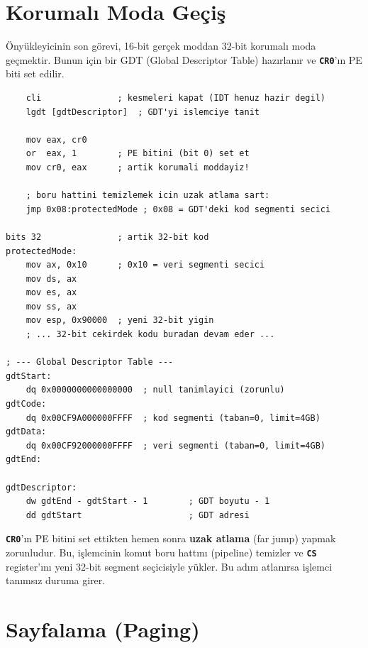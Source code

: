 \documentclass[11pt,a4paper]{article}
\newcommand{\reg}[1]{\texttt{\color{anaMavi}\textbf{#1}}}
\begin{document}
\section{Korumalı Moda Geçiş}

Önyükleyicinin son görevi, 16-bit gerçek moddan 32-bit korumalı moda geçmektir.
Bunun için bir GDT (Global Descriptor Table) hazırlanır ve \reg{CR0}'ın PE
biti set edilir.

\begin{ornekkutu}
\begin{lstlisting}
    cli               ; kesmeleri kapat (IDT henuz hazir degil)
    lgdt [gdtDescriptor]  ; GDT'yi islemciye tanit

    mov eax, cr0
    or  eax, 1        ; PE bitini (bit 0) set et
    mov cr0, eax      ; artik korumali moddayiz!

    ; boru hattini temizlemek icin uzak atlama sart:
    jmp 0x08:protectedMode ; 0x08 = GDT'deki kod segmenti secici

bits 32               ; artik 32-bit kod
protectedMode:
    mov ax, 0x10      ; 0x10 = veri segmenti secici
    mov ds, ax
    mov es, ax
    mov ss, ax
    mov esp, 0x90000  ; yeni 32-bit yigin
    ; ... 32-bit cekirdek kodu buradan devam eder ...

; --- Global Descriptor Table ---
gdtStart:
    dq 0x0000000000000000  ; null tanimlayici (zorunlu)
gdtCode:
    dq 0x00CF9A000000FFFF  ; kod segmenti (taban=0, limit=4GB)
gdtData:
    dq 0x00CF92000000FFFF  ; veri segmenti (taban=0, limit=4GB)
gdtEnd:

gdtDescriptor:
    dw gdtEnd - gdtStart - 1        ; GDT boyutu - 1
    dd gdtStart                     ; GDT adresi
\end{lstlisting}
\end{ornekkutu}

\begin{uyarikutu}
\reg{CR0}'ın PE bitini set ettikten hemen sonra \textbf{uzak atlama} (far jump)
yapmak zorunludur. Bu, işlemcinin komut boru hattını (pipeline) temizler ve
\reg{CS} register'ını yeni 32-bit segment seçicisiyle yükler. Bu adım
atlanırsa işlemci tanımsız duruma girer.
\end{uyarikutu}

\section{Sayfalama (Paging)}
\end{document}
